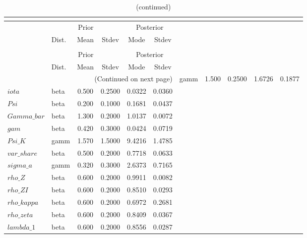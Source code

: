  
\begin{center}
\begin{longtable}{llcccc} 
\caption{Results from posterior maximization (parameters)}\\
 \label{Table:Posterior:1}\\
\toprule 
  & \multicolumn{3}{c}{Prior}  &  \multicolumn{2}{c}{Posterior} \\
  \cmidrule(r{.75em}){2-4} \cmidrule(r{.75em}){5-6}
  & Dist. & Mean  & Stdev & Mode & Stdev \\ 
\midrule \endfirsthead 
\caption{(continued)}\\
 \bottomrule 
  & \multicolumn{3}{c}{Prior}  &  \multicolumn{2}{c}{Posterior} \\
  \cmidrule(r{.75em}){2-4} \cmidrule(r{.75em}){5-6}
  & Dist. & Mean  & Stdev & Mode & Stdev \\ 
\midrule \endhead 
\bottomrule \multicolumn{6}{r}{(Continued on next page)}\endfoot 
\bottomrule\endlastfoot 
$sigma$ & gamm &   1.500 & 0.2500 &   1.6726 &  0.1877 \\ 
$iota$ & beta &   0.500 & 0.2500 &   0.0322 &  0.0360 \\ 
$Psi$ & beta &   0.200 & 0.1000 &   0.1681 &  0.0437 \\ 
$Gamma\_bar$ & beta &   1.300 & 0.2000 &   1.0137 &  0.0072 \\ 
$gam$ & beta &   0.420 & 0.3000 &   0.0424 &  0.0719 \\ 
$Psi\_K$ & gamm &   1.570 & 1.5000 &   9.4216 &  1.4785 \\ 
$var\_share$ & beta &   0.500 & 0.2000 &   0.7718 &  0.0633 \\ 
$sigma\_a$ & gamm &   0.320 & 0.3000 &   2.6373 &  0.7165 \\ 
$rho\_Z$ & beta &   0.600 & 0.2000 &   0.9911 &  0.0082 \\ 
$rho\_ZI$ & beta &   0.600 & 0.2000 &   0.8510 &  0.0293 \\ 
$rho\_kappa$ & beta &   0.600 & 0.2000 &   0.6972 &  0.2681 \\ 
$rho\_zeta$ & beta &   0.600 & 0.2000 &   0.8409 &  0.0367 \\ 
$lambda\_1$ & beta &   0.600 & 0.2000 &   0.8556 &  0.0287 \\ 
\end{longtable}
 \end{center}

